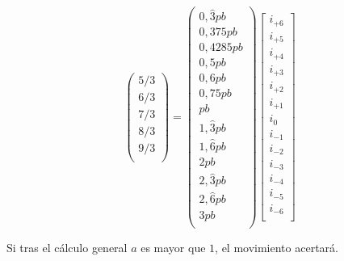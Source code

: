\documentclass[a4paper, 11pt, titlepage]{article}
\begin{document}
\[\begin{pmatrix}
                5/3 \\ 
                6/3 \\ 
                7/3 \\ 
                8/3 \\ 
                9/3 \\ 
            \end{pmatrix}
            = 
            \begin{pmatrix}
                0,\widehat{3}pb \\ 
                0,375pb \\ 
                0,4285pb \\ 
                0,5pb \\ 
                0,6pb \\ 
                0,75pb \\ 
                pb \\ 
                1,\widehat{3}pb \\ 
                1,\widehat{6}pb \\ 
                2pb \\ 
                2,\widehat{3}pb \\ 
                2,\widehat{6}pb \\ 
                3pb \\ 
            \end{pmatrix}
            \begin{bmatrix}
                i_{+6} \\
                i_{+5} \\
                i_{+4} \\
                i_{+3} \\
                i_{+2} \\
                i_{+1} \\
                i_{0} \\
                i_{-1} \\
                i_{-2} \\
                i_{-3} \\
                i_{-4} \\
                i_{-5} \\
                i_{-6} \\
            \end{bmatrix}
        \]

        Si tras el cálculo general $a$ es mayor que $1$, el movimiento acertará.
\end{document}
